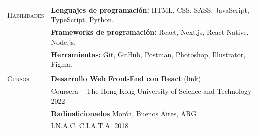 \documentclass[11pt]{article}
\begin{document}
\begin{tabular}[t]{@{}p{30mm} @{}p{150mm}}
   {\scshape Habilidades}
                     &
   \textbf{Lenguajes de programación: }  HTML, CSS, SASS, JavaScript, TypeScript, Python.%
   \vspace{0.7\baselineskip}
   \\
                     &
   \textbf{Frameworks de programación: } React, Next.js, React Native, Node.js.%
   \vspace{0.7\baselineskip}
   \\
                     &
   \textbf{Herramientas: }  Git, GitHub, Postman, Photoshop, Illustrator, Figma.%
   \\
                     &
   \vspace{.3\baselineskip}
   {\noindent\hspace{-50mm}\hrulefill}
   \vspace{.7\baselineskip}
   \\
   {\scshape Cursos} & \textbf{Desarrollo Web Front-End con React} \href{https://coursera.org/share/3222a48520eb4c70d96723ded8063968}{\small(link)}  \hfill \vspace{0.015in} \\
                     & Coursera -- The Hong Kong University of Science and Technology \hfill 2022\vspace{0.015in}
   \vspace{0.7\baselineskip}                                                                                                                                                 \\
                     & \textbf{Radioaficionados}  \hfill Morón, Buenos Aires, ARG\vspace{0.015in}                                                                                       \\
                     & I.N.A.C. C.I.A.T.A. \hfill 2018\vspace{0.015in}

\end{tabular}
\end{document}
